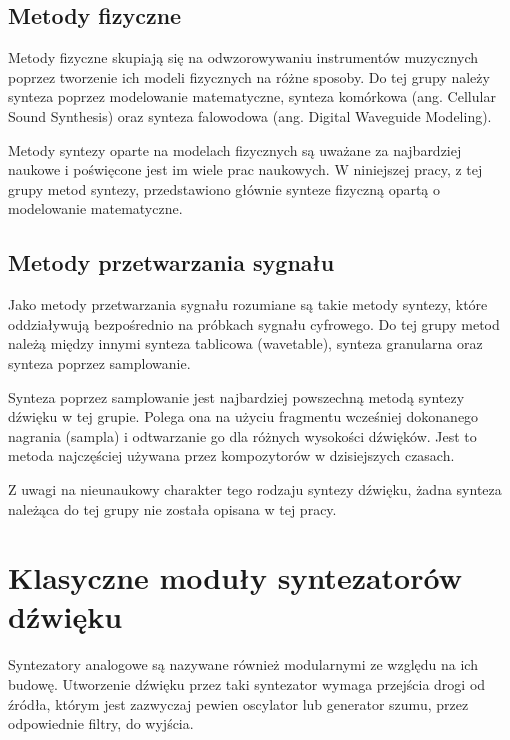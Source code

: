 \subsection{Metody fizyczne}
Metody fizyczne skupiają się na odwzorowywaniu instrumentów muzycznych poprzez tworzenie ich modeli fizycznych na różne sposoby. Do tej grupy należy synteza poprzez modelowanie matematyczne, synteza komórkowa (ang. Cellular Sound Synthesis) oraz synteza falowodowa (ang. Digital Waveguide Modeling).

Metody syntezy oparte na modelach fizycznych są uważane za najbardziej naukowe i poświęcone jest im wiele prac naukowych. W niniejszej pracy, z tej grupy metod syntezy, przedstawiono głównie synteze fizyczną opartą o modelowanie matematyczne.

\subsection{Metody przetwarzania sygnału}
Jako metody przetwarzania sygnału rozumiane są takie metody syntezy, które oddziaływują bezpośrednio na próbkach sygnału cyfrowego. Do tej grupy metod należą między innymi synteza tablicowa (wavetable), synteza granularna oraz synteza poprzez samplowanie.

Synteza poprzez samplowanie jest najbardziej powszechną metodą syntezy dźwięku w tej grupie. Polega ona na użyciu fragmentu wcześniej dokonanego nagrania (sampla) i odtwarzanie go dla różnych wysokości dźwięków. Jest to metoda najczęściej używana przez kompozytorów w dzisiejszych czasach.

Z uwagi na nieunaukowy charakter tego rodzaju syntezy dźwięku, żadna synteza należąca do tej grupy nie została opisana w tej pracy.



\section{Klasyczne moduły syntezatorów dźwięku}
Syntezatory analogowe są nazywane również modularnymi ze względu na ich budowę. Utworzenie dźwięku przez taki syntezator wymaga przejścia drogi od źródła, którym jest zazwyczaj pewien oscylator lub generator szumu, przez odpowiednie filtry, do wyjścia.

